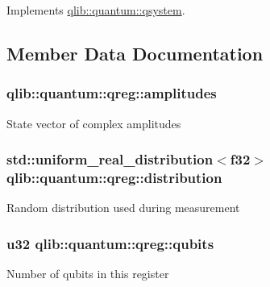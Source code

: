 Implements \hyperlink{classqlib_1_1quantum_1_1qsystem_a5626857e5dc87dc2bdbb1f4d0b0401f9}{qlib\+::quantum\+::qsystem}.



\subsection{Member Data Documentation}
\subsubsection[{\texorpdfstring{amplitudes}{amplitudes}}]{ qlib\+::quantum\+::qreg\+::amplitudes\hspace{0.3cm}{\ttfamily [private]}}\hypertarget{classqlib_1_1quantum_1_1qreg_a1a7e244ee72b78b9c5a8763efad57ada}{}\label{classqlib_1_1quantum_1_1qreg_a1a7e244ee72b78b9c5a8763efad57ada}
State vector of complex amplitudes 
\subsubsection[{\texorpdfstring{distribution}{distribution}}]{\setlength{\rightskip}{0pt plus 5cm}std\+::uniform\+\_\+real\+\_\+distribution$<$f32$>$ qlib\+::quantum\+::qreg\+::distribution\hspace{0.3cm}{\ttfamily [private]}}\hypertarget{classqlib_1_1quantum_1_1qreg_aabd605497170f57cdbb175d21c99662e}{}\label{classqlib_1_1quantum_1_1qreg_aabd605497170f57cdbb175d21c99662e}
Random distribution used during measurement 
\subsubsection[{\texorpdfstring{qubits}{qubits}}]{\setlength{\rightskip}{0pt plus 5cm}u32 qlib\+::quantum\+::qreg\+::qubits\hspace{0.3cm}{\ttfamily [private]}}\hypertarget{classqlib_1_1quantum_1_1qreg_a2d7c33e71a77d860d50d53a258a71a6f}{}\label{classqlib_1_1quantum_1_1qreg_a2d7c33e71a77d860d50d53a258a71a6f}
Number of qubits in this register 
